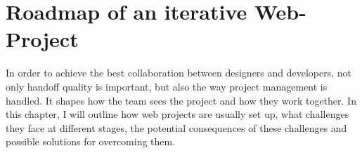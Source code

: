 \newpage
\section{Roadmap of an iterative Web-Project} %
In order to achieve the best collaboration between designers and developers, not only handoff
quality is important, but also the way project management is handled. It shapes how the team sees
the project and how they work together. In this chapter, I will outline how web projects are usually
set up, what challenges they face at different stages, the potential consequences of these
challenges and possible solutions for overcoming them.





